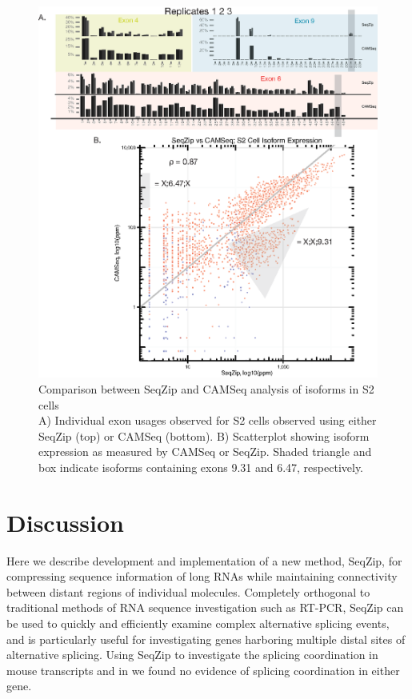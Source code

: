 		\begin{figure} %
			  \centering 
			  \includegraphics{Figures/SeqZipPaper/Roy2014FigS5.eps}
			  \caption[Comparison between SeqZip and CAMSeq analysis of \dscam{} isoforms in S2 cells]
			  {Comparison between SeqZip and CAMSeq analysis of \dscam{} isoforms in S2 cells \\[0.25cm]
			    A) Individual exon usages observed for S2 cells observed using either SeqZip (top) or CAMSeq (bottom). B) Scatterplot showing isoform expression as measured by CAMSeq or SeqZip. Shaded triangle and box indicate isoforms containing exons 9.31 and 6.47, respectively.
			    }
			  \label{SeqZipPaper:fig:Roy2014 FS5}
			  \end{figure}

\section{Discussion}
	\label{SeqZipPaper:sec:Discussion}

	Here we describe development and implementation of a new method, SeqZip, for compressing sequence information of long RNAs while maintaining connectivity between distant regions of individual molecules. Completely orthogonal to traditional methods of RNA sequence investigation such as RT-PCR, SeqZip can be used to quickly and efficiently examine complex alternative splicing events, and is particularly useful for investigating genes harboring multiple distal sites of alternative splicing. Using SeqZip to investigate the splicing coordination in mouse \fn{} transcripts and in \flies{} \dscam{} we found no evidence of splicing coordination in either gene. 

